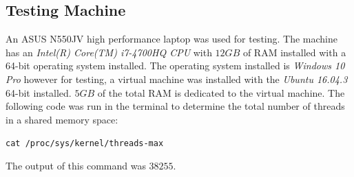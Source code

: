 \documentclass[10pt, conference]{IEEEtran}
\def\code#1{\texttt{#1}}
\begin{document}
\subsection{Testing Machine}
\label{Testing Machine}
An ASUS N550JV high performance laptop was used for testing. The machine has an \emph{Intel(R) Core(TM) i7-4700HQ CPU} with $12GB$ of RAM installed with a 64-bit operating system installed. The operating system installed is \emph{Windows 10 Pro} however for testing, a virtual machine was installed with the \emph{Ubuntu 16.04.3} 64-bit installed. $5GB$ of the total RAM is dedicated to the virtual machine. The following code was run in the terminal to determine the total number of threads in a shared memory space:

\code{cat /proc/sys/kernel/threads-max}

The output of this command was $38255$.
\end{document}
